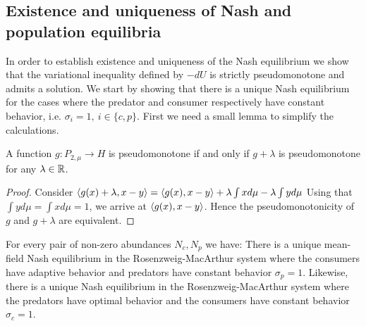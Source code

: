 \subsection{Existence and uniqueness of Nash and population equilibria}
In order to establish existence and uniqueness of the Nash equilibrium we show that the variational inequality defined by $-dU$ is strictly pseudomonotone and admits a solution. We start by showing that there is a unique Nash equilibrium for the cases where the predator and consumer respectively have constant behavior, i.e. $\sigma_i = 1,~i\in \{c,p\}$. First we need a small lemma to simplify the calculations.
\begin{lemma}
  \label{lem:pseudo_reduc}
  A function $g: P_{2,\mu} \to H$ is pseudomonotone if and only if $g+\lambda$ is pseudomonotone for any $\lambda \in \mathbb{R}$.
\end{lemma}
\begin{proof}
  Consider $\left \langle g(x)+\lambda,x-y \right \rangle=\left \langle g(x),x-y \right \rangle+\lambda \int x d\mu - \lambda \int y d\mu$
  Using that $\int y d\mu = \int x d\mu = 1$, we arrive at  $\left \langle g(x),x-y \right \rangle$.
  Hence the pseudomonotonicity of $g$ and $g+\lambda$ are equivalent.
\end{proof}
\begin{proposition}
  For every pair of non-zero abundances $N_c,N_p$ we have:
  There is a unique mean-field Nash equilibrium in the Rosenzweig-MacArthur system where the consumers have adaptive behavior and predators have constant behavior $\sigma_p = 1$.
  Likewise, there is a unique Nash equilibrium in the Rosenzweig-MacArthur system where the predators have optimal behavior and the consumers have constant behavior $\sigma_c = 1$.
\end{proposition}

